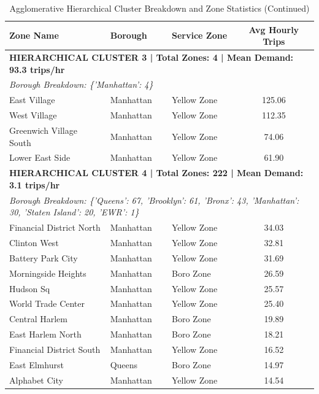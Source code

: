 \documentclass[11pt,a4paper]{article}
\begin{document}
\begin{table}[htbp]
    \centering
    \small
    \caption{Agglomerative Hierarchical Cluster Breakdown and Zone Statistics (Continued)}
    \label{tab:hierarchical_exact_clusters_cont}
    \begin{tabular}{lllc}
        \toprule
        \textbf{Zone Name} & \textbf{Borough} & \textbf{Service Zone} & \textbf{Avg Hourly Trips} \\
        \midrule
        \multicolumn{4}{l}{\textbf{HIERARCHICAL CLUSTER 3 | Total Zones: 4 | Mean Demand: 93.3 trips/hr}} \\
        \multicolumn{4}{l}{\textit{Borough Breakdown: \{'Manhattan': 4\}}} \\
        \midrule
        East Village & Manhattan & Yellow Zone & 125.06 \\
        West Village & Manhattan & Yellow Zone & 112.35 \\
        Greenwich Village South & Manhattan & Yellow Zone & 74.06 \\
        Lower East Side & Manhattan & Yellow Zone & 61.90 \\
        \midrule
        \multicolumn{4}{l}{\textbf{HIERARCHICAL CLUSTER 4 | Total Zones: 222 | Mean Demand: 3.1 trips/hr}} \\
        \multicolumn{4}{l}{\textit{Borough Breakdown: \{'Queens': 67, 'Brooklyn': 61, 'Bronx': 43, 'Manhattan': 30, 'Staten Island': 20, 'EWR': 1\}}} \\
        \midrule
        Financial District North & Manhattan & Yellow Zone & 34.03 \\
        Clinton West & Manhattan & Yellow Zone & 32.81 \\
        Battery Park City & Manhattan & Yellow Zone & 31.69 \\
        Morningside Heights & Manhattan & Boro Zone & 26.59 \\
        Hudson Sq & Manhattan & Yellow Zone & 25.57 \\
        World Trade Center & Manhattan & Yellow Zone & 25.40 \\
        Central Harlem & Manhattan & Boro Zone & 19.89 \\
        East Harlem North & Manhattan & Boro Zone & 18.21 \\
        Financial District South & Manhattan & Yellow Zone & 16.52 \\
        East Elmhurst & Queens & Boro Zone & 14.97 \\
        Alphabet City & Manhattan & Yellow Zone & 14.54 \\

\end{tabular}
\end{table}
\end{document}
